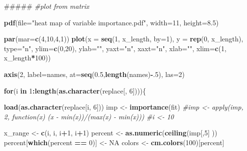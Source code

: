 \documentclass[]{book}
\newenvironment{Shaded}{\begin{snugshade}}{\end{snugshade}}
\newcommand{\KeywordTok}[1]{\textcolor[rgb]{0.13,0.29,0.53}{\textbf{{#1}}}}
\newcommand{\DataTypeTok}[1]{\textcolor[rgb]{0.13,0.29,0.53}{{#1}}}
\newcommand{\DecValTok}[1]{\textcolor[rgb]{0.00,0.00,0.81}{{#1}}}
\newcommand{\FloatTok}[1]{\textcolor[rgb]{0.00,0.00,0.81}{{#1}}}
\newcommand{\StringTok}[1]{\textcolor[rgb]{0.31,0.60,0.02}{{#1}}}
\newcommand{\CommentTok}[1]{\textcolor[rgb]{0.56,0.35,0.01}{\textit{{#1}}}}
\newcommand{\OtherTok}[1]{\textcolor[rgb]{0.56,0.35,0.01}{{#1}}}
\newcommand{\ControlFlowTok}[1]{\textcolor[rgb]{0.13,0.29,0.53}{\textbf{{#1}}}}
\newcommand{\OperatorTok}[1]{\textcolor[rgb]{0.81,0.36,0.00}{\textbf{{#1}}}}
\newcommand{\NormalTok}[1]{{#1}}
\theoremstyle{definition}
\theoremstyle{definition}
\theoremstyle{definition}
\theoremstyle{remark}
\begin{document}
\begin{Shaded}
\begin{Highlighting}[]
\NormalTok{#####}
\CommentTok{#plot from matrix}










\KeywordTok{pdf}\NormalTok{(}\DataTypeTok{file=}\StringTok{"heat map of variable importance.pdf"}\NormalTok{, }\DataTypeTok{width=}\DecValTok{11}\NormalTok{, }\DataTypeTok{height=}\FloatTok{8.5}\NormalTok{)}

\KeywordTok{par}\NormalTok{(}\DataTypeTok{mar=}\KeywordTok{c}\NormalTok{(}\DecValTok{4}\NormalTok{,}\DecValTok{10}\NormalTok{,}\DecValTok{4}\NormalTok{,}\DecValTok{1}\NormalTok{))}
\KeywordTok{plot}\NormalTok{(}\DataTypeTok{x =} \KeywordTok{seq}\NormalTok{(}\DecValTok{1}\NormalTok{, x_length, }\DataTypeTok{by=}\DecValTok{1}\NormalTok{), }\DataTypeTok{y =} \KeywordTok{rep}\NormalTok{(}\DecValTok{0}\NormalTok{, x_length), }\DataTypeTok{type=}\StringTok{"n"}\NormalTok{, }\DataTypeTok{ylim=}\KeywordTok{c}\NormalTok{(}\DecValTok{0}\NormalTok{,}\DecValTok{20}\NormalTok{), }\DataTypeTok{ylab=}\StringTok{""}\NormalTok{, }\DataTypeTok{yaxt=}\StringTok{"n"}\NormalTok{, }\DataTypeTok{xaxt=}\StringTok{"n"}\NormalTok{, }\DataTypeTok{xlab=}\StringTok{""}\NormalTok{, }\DataTypeTok{xlim=}\KeywordTok{c}\NormalTok{(}\DecValTok{1}\NormalTok{, x_length}\OperatorTok{*}\DecValTok{100}\NormalTok{))}

\KeywordTok{axis}\NormalTok{(}\DecValTok{2}\NormalTok{, }\DataTypeTok{label=}\NormalTok{names, }\DataTypeTok{at=}\KeywordTok{seq}\NormalTok{(}\FloatTok{0.5}\NormalTok{,}\KeywordTok{length}\NormalTok{(names)}\OperatorTok{-}\NormalTok{.}\DecValTok{5}\NormalTok{), }\DataTypeTok{las=}\DecValTok{2}\NormalTok{)}


\ControlFlowTok{for}\NormalTok{(i }\ControlFlowTok{in} \DecValTok{1}\OperatorTok{:}\KeywordTok{length}\NormalTok{(}\KeywordTok{as.character}\NormalTok{(replace[, }\DecValTok{6}\NormalTok{])))\{}
    
    \KeywordTok{load}\NormalTok{(}\KeywordTok{as.character}\NormalTok{(replace[i, }\DecValTok{6}\NormalTok{]))}
\NormalTok{    imp <-}\StringTok{ }\KeywordTok{importance}\NormalTok{(fit)}
\CommentTok{#imp <- apply(imp, 2, function(x) (x - min(x))/(max(x) - min(x)))}
    \CommentTok{#i <- 10}
    
\NormalTok{x_range <-}\StringTok{ }\KeywordTok{c}\NormalTok{(i, i, i}\OperatorTok{+}\DecValTok{1}\NormalTok{, i}\OperatorTok{+}\DecValTok{1}\NormalTok{)    }
\NormalTok{percent <-}\StringTok{ }\KeywordTok{as.numeric}\NormalTok{(}\KeywordTok{ceiling}\NormalTok{(imp[,}\DecValTok{5}\NormalTok{] ))}
\NormalTok{percent[}\KeywordTok{which}\NormalTok{(percent }\OperatorTok{==}\StringTok{ }\DecValTok{0}\NormalTok{)] <-}\StringTok{ }\OtherTok{NA}
\NormalTok{colors <-}\StringTok{ }\KeywordTok{cm.colors}\NormalTok{(}\DecValTok{100}\NormalTok{)[percent]}


\end{Highlighting}
\end{Shaded}
\end{document}
